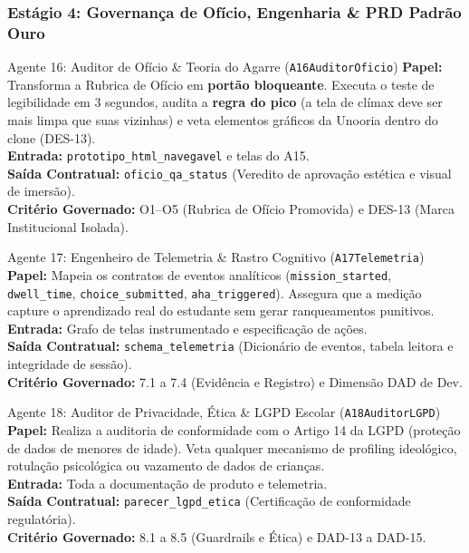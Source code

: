 \documentclass[11pt,a4paper]{article}
\begin{document}
\subsubsection{Est\'agio 4: Governan\c{c}a de Of\'icio, Engenharia \& PRD Padr\~ao Ouro}

\begin{agentbox}{Agente 16: Auditor de Of\'icio \& Teoria do Agarre (\texttt{A16AuditorOficio})}
\textbf{Papel:} Transforma a Rubrica de Of\'icio em \textbf{port\~ao bloqueante}. Executa o teste de legibilidade em 3 segundos, audita a \textbf{regra do pico} (a tela de cl\'imax deve ser mais limpa que suas vizinhas) e veta elementos gr\'aficos da Unooria dentro do clone (DES-13).\\
\textbf{Entrada:} \texttt{prototipo\_html\_navegavel} e telas do A15.\\
\textbf{Sa\'ida Contratual:} \texttt{oficio\_qa\_status} (Veredito de aprova\c{c}\~ao estética e visual de imers\~ao).\\
\textbf{Crit\'erio Governado:} O1--O5 (Rubrica de Of\'icio Promovida) e DES-13 (Marca Institucional Isolada).
\end{agentbox}

\begin{agentbox}{Agente 17: Engenheiro de Telemetria \& Rastro Cognitivo (\texttt{A17Telemetria})}
\textbf{Papel:} Mapeia os contratos de eventos anal\'iticos (\texttt{mission\_started}, \texttt{dwell\_time}, \texttt{choice\_submitted}, \texttt{aha\_triggered}). Assegura que a medi\c{c}\~ao capture o aprendizado real do estudante sem gerar ranqueamentos punitivos.\\
\textbf{Entrada:} Grafo de telas instrumentado e especifica\c{c}\~ao de a\c{c}\~oes.\\
\textbf{Sa\'ida Contratual:} \texttt{schema\_telemetria} (Dicion\'ario de eventos, tabela leitora e integridade de sess\~ao).\\
\textbf{Crit\'erio Governado:} 7.1 a 7.4 (Evid\^encia e Registro) e Dimens\~ao DAD de Dev.
\end{agentbox}

\begin{agentbox}{Agente 18: Auditor de Privacidade, \'Etica \& LGPD Escolar (\texttt{A18AuditorLGPD})}
\textbf{Papel:} Realiza a auditoria de conformidade com o Artigo 14 da LGPD (prote\c{c}\~ao de dados de menores de idade). Veta qualquer mecanismo de profiling ideol\'ogico, rotula\c{c}\~ao psicol\'ogica ou vazamento de dados de crian\c{c}as.\\
\textbf{Entrada:} Toda a documenta\c{c}\~ao de produto e telemetria.\\
\textbf{Sa\'ida Contratual:} \texttt{parecer\_lgpd\_etica} (Certifica\c{c}\~ao de conformidade regulat\'oria).\\
\textbf{Crit\'erio Governado:} 8.1 a 8.5 (Guardrails e \'Etica) e DAD-13 a DAD-15.
\end{agentbox}
\end{document}
